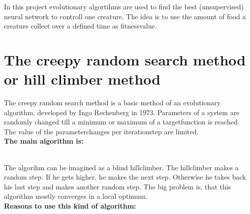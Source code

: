 \documentclass[10pt,a4paper,DIV=11]{scrreprt}
\begin{document}
In this project evolutionary algortihms are used to find the best 
(unsupervised) neural network to controll one creature. The idea is to use the amount of food a creature collect over a defined time as fitnessvalue.

\section{The creepy random search method or hill climber method}
The creepy random search method is a basic method of an evolutionary algorithm, developed by Ingo Rechenberg in 1973. %
Parameters of a system are randomly changed till a minimum or maximum of a targetfunction is reached. The value of the parameterchanges per iterationstep are limited. \\

\textbf{The main algorithm is:}

 \\

The algorihm can be imagined as a blind hillclimber. The hillclimber makes a random step. If he gets higher, he makes the next step. Otherwise he takes back his last step and makes another random step. The big problem is, that this algorithm mostly converges in a local optimum. \\

\textbf{Reasons to use this kind of algorithm:}

   \\
\end{document}
